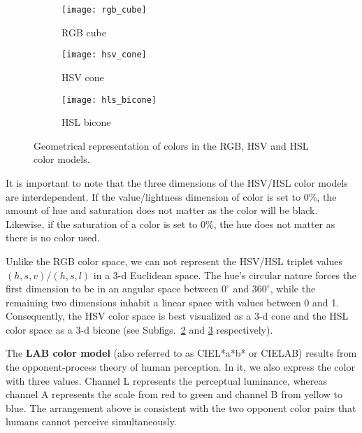 \begin{figure}[!ht] 
	\centering
	\begin{subfigure}[b]{0.32\textwidth}
		\centering
		\texttt{[image: rgb\_cube]}
		\caption{RGB cube}	
		\label{fig:rgb_cube}
	\end{subfigure}
	\begin{subfigure}[b]{0.32\textwidth}
		\centering
		\texttt{[image: hsv\_cone]}
		\caption{HSV cone}	
		\label{fig:hsv_cone}
	\end{subfigure}
	\begin{subfigure}[b]{0.32\textwidth}
		\centering
		\texttt{[image: hls\_bicone]}
		\caption{HSL bicone}	
		\label{fig:hls_bicone}
	\end{subfigure}
	
	\caption{Geometrical representation of colors in the RGB, HSV and HSL color models.}
	\label{fig:cube_cone_bicone}
\end{figure}

It is important to note that the three dimensions of the HSV/HSL color models are interdependent. If the value/lightness dimension of color is set to 0\%, the amount of hue and saturation does not matter as the color will be black. Likewise, if the saturation of a color is set to 0\%, the hue does not matter as there is no color used.

Unlike the RGB color space, we can not represent the HSV/HSL triplet values $(h,s,v)$/$(h,s,l)$ in a 3-d Euclidean space. The hue's circular nature forces the first dimension to be in an angular space between $0^\circ$ and $360^\circ$, while the remaining two dimensions inhabit a linear space with values between 0 and 1. Consequently, the HSV color space is best visualized as a 3-d cone and the HSL color space as a 3-d bicone (see Subfigs.\ \ref{fig:hsv_cone} and \ref{fig:hls_bicone} respectively).

The \textbf{LAB color model} (also referred to as CIEL*a*b* or CIELAB) results from the opponent-process theory of human perception. In it, we also express the color with three values. Channel L represents the perceptual luminance, whereas channel A represents the scale from red to green and channel B from yellow to blue. The arrangement above is consistent with the two opponent color pairs that humans cannot perceive simultaneously.

